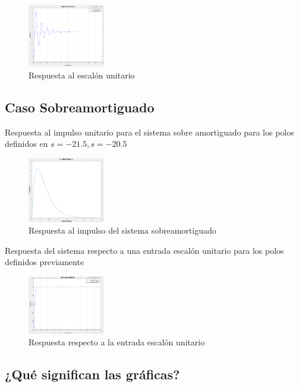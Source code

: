 \documentclass[conference]{IEEEtran}
\begin{document}
	\begin{figure}[h]
		\centering
		\includegraphics[width=0.3\textwidth]{media/sub-escalon}
		\caption{Respuesta al escalón unitario}
		\label{fig:sub-escalon}
	\end{figure}
	
	
	\subsection{Caso Sobreamortiguado}
	
	Respuesta al impulso unitario para el sistema sobre amortiguado para los polos definidos en $ s = -21.5, s = - 20.5$
	
	\begin{figure}[h]
		\centering
		\includegraphics[width=0.3\textwidth]{media/sobre-impulso}
		\caption{Respuesta al impulso del sistema sobreamortiguado}
		\label{fig:sobre-impulso}
	\end{figure}
	Respuesta del sistema respecto a una entrada escalón unitario para los polos definidos previamente
	\begin{figure}[h]
		\centering
		\includegraphics[width=0.3\textwidth]{media/sobre-escalon}
		\caption{Respuesta respecto a la entrada escalón unitario}
		\label{fig:sobre-escalon}
	\end{figure}
	
	\subsection{¿Qué significan las gráficas?}
	
\end{document}
